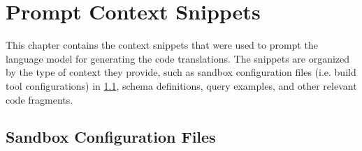 \chapter{Prompt Context Snippets}
\label{chap:appendix-context-snippets}

This chapter contains the context snippets that were used to prompt the language model for generating the code translations. The snippets are organized by the type of context they provide, such as sandbox configuration files (i.e. build tool configurations) in \cref{sec:appendix-sandbox-config}, schema definitions, query examples, and other relevant code fragments.

\section{Sandbox Configuration Files}
\label{sec:appendix-sandbox-config}

\begin{listing}[H]
\inputminted[fontsize=\footnotesize, linenos, breaklines, frame=single]{xml}{code/efcore-sandbox.csproj}
\caption{Entity Framework Core 8.0.0 \texttt{.csproj} file for the .NET sandbox project.}
\label{lst:efcore-sandbox-csproj}
\end{listing}

\begin{listing}[H]
\inputminted[fontsize=\footnotesize, linenos, breaklines, frame=single]{xml}{code/nhibernate-sandbox.csproj}
\caption{NHibernate \texttt{.csproj} file for the .NET sandbox project.}
\label{lst:nhibernate-sandbox-csproj}
\end{listing}

\begin{listing}[H]
\inputminted[fontsize=\footnotesize, linenos, breaklines, frame=single]{xml}{code/dapper-sandbox.csproj}
\caption{Dapper \texttt{.csproj} file for the .NET sandbox project.}
\label{lst:dapper-sandbox-csproj}
\end{listing}

\begin{listing}[H]
\inputminted[fontsize=\footnotesize, linenos, breaklines, frame=single]{xml}{code/mongo-pom.xml}
\caption{MongoDB \texttt{pom.xml} file for the Java sandbox project.}
\label{lst:mongo-pom-xml}
\end{listing}

\begin{listing}[H]
\inputminted[fontsize=\footnotesize, linenos, breaklines, frame=single]{xml}{code/neo4j-pom.xml}
\caption{Neo4j \texttt{pom.xml} file for the Java sandbox project.}
\label{lst:neo4j-pom-xml}
\end{listing}
